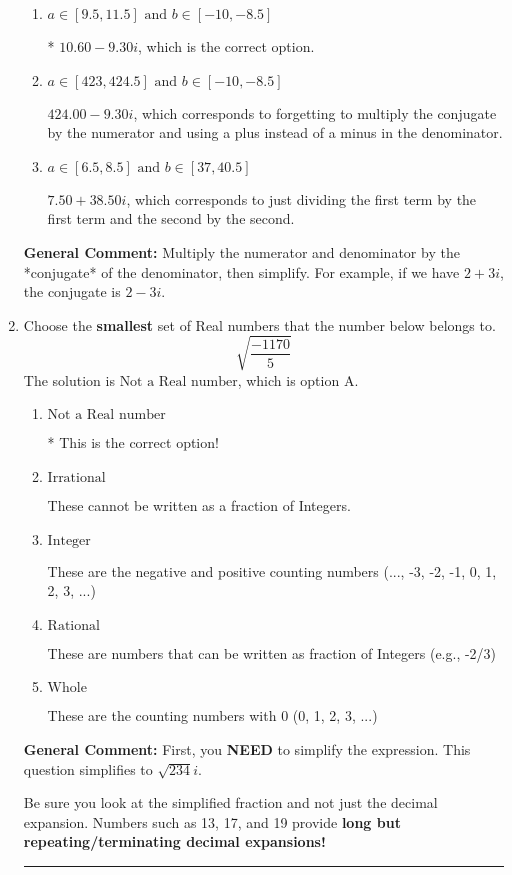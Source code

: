 \documentclass{extbook}[14pt]
\newcommand{\litem}[1]{\item #1

\rule{\textwidth}{0.4pt}}
\begin{document}
\begin{enumerate}
{\begin{enumerate}[label=\Alph*.]
 $2.90  - 13.80 i$, which corresponds to forgetting to multiply the conjugate by the numerator and not computing the conjugate correctly.
\item \( a \in [9.5, 11.5] \text{ and } b \in [-10, -8.5] \)

* $10.60  - 9.30 i$, which is the correct option.
\item \( a \in [423, 424.5] \text{ and } b \in [-10, -8.5] \)

 $424.00  - 9.30 i$, which corresponds to forgetting to multiply the conjugate by the numerator and using a plus instead of a minus in the denominator.
\item \( a \in [6.5, 8.5] \text{ and } b \in [37, 40.5] \)

 $7.50  + 38.50 i$, which corresponds to just dividing the first term by the first term and the second by the second.
\end{enumerate}

\textbf{General Comment:} Multiply the numerator and denominator by the *conjugate* of the denominator, then simplify. For example, if we have $2+3i$, the conjugate is $2-3i$.
}
\litem{
Choose the \textbf{smallest} set of Real numbers that the number below belongs to.
\[ \sqrt{\frac{-1170}{5}} \]The solution is \( \text{Not a Real number} \), which is option A.\begin{enumerate}[label=\Alph*.]
\item \( \text{Not a Real number} \)

* This is the correct option!
\item \( \text{Irrational} \)

These cannot be written as a fraction of Integers.
\item \( \text{Integer} \)

These are the negative and positive counting numbers (..., -3, -2, -1, 0, 1, 2, 3, ...)
\item \( \text{Rational} \)

These are numbers that can be written as fraction of Integers (e.g., -2/3)
\item \( \text{Whole} \)

These are the counting numbers with 0 (0, 1, 2, 3, ...)
\end{enumerate}

\textbf{General Comment:} First, you \textbf{NEED} to simplify the expression. This question simplifies to $\sqrt{234} i$. 
 
 Be sure you look at the simplified fraction and not just the decimal expansion. Numbers such as 13, 17, and 19 provide \textbf{long but repeating/terminating decimal expansions!} 
 
}
\end{enumerate}
\end{document}
